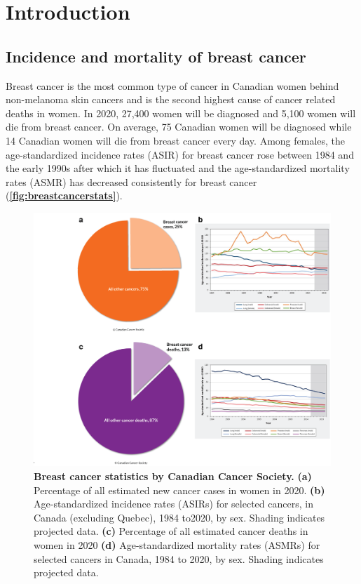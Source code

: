 
\chapter{Introduction}
\label{ch:Introduction}

\section{Incidence and mortality of breast cancer}
Breast cancer is the most common type of cancer in Canadian women behind non-melanoma skin cancers and is the second highest cause of cancer related deaths in women. In 2020, 27,400 women will be diagnosed and 5,100 women will die from breast cancer. On average, 75 Canadian women will be diagnosed while 14 Canadian women will die from breast cancer every day. Among females, the age-standardized incidence rates (ASIR) for breast cancer rose between 1984 and the early 1990s after which it has fluctuated and the age-standardized mortality rates (ASMR) has decreased consistently for breast cancer \cite{canadian2020canadian} (\textbf{\autoref{fig:breastcancerstats}}).

\begin{figure}
\centering
\includegraphics[width=\textwidth]{Figures/chap1/breastcancerstats.png}
	\caption[Breast cancer statistics by Canadian cancer society ]
	{\small
	    \textbf{Breast cancer statistics by Canadian Cancer Society.}
	    \textbf{(a)} Percentage of all estimated new cancer cases in women in 2020.
	    \textbf{(b)} Age-standardized incidence rates (ASIRs) for selected cancers, in Canada (excluding Quebec), 1984 to2020, by sex. Shading indicates projected data.
	    \textbf{(c)} Percentage of all estimated cancer deaths in women in 2020
	     \textbf{(d)} Age-standardized mortality rates (ASMRs) for selected cancers in Canada, 1984 to 2020, by sex. Shading indicates projected data.
	}
	\label{fig:breastcancerstats}
\end{figure}

